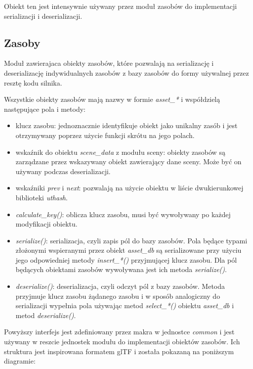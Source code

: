 Obiekt ten jest intensywnie używany przez moduł zasobów do implementacji serializacji i deserializacji.

\subsection{Zasoby}

Moduł zawierajaca obiekty zasobów, które pozwalają na serializację i deserializację indywidualnych zasobów z bazy zasobów do formy używalnej przez resztę kodu silnika.

Wszystkie obiekty zasobów mają nazwy w formie \textit{asset\_*} i współdzielą następujące pola i metody:
\begin{itemize}
	\item klucz zasobu: jednoznacznie identyfikuje obiekt jako unikalny zasób i jest otrzymywany poprzez użycie funkcji skrótu na jego polach.
	\item wskaźnik do obiektu \textit{scene\_data} z modułu sceny: obiekty zasobów są zarządzane przez wskazywany obiekt zawierający dane sceny. Może być on używany podczas deserializacji.
	\item wskaźniki \textit{prev} i \textit{next}: pozwalają na użycie obiektu w liście dwukierunkowej biblioteki \textit{uthash}.
	\item \textit{calculate\_key()}: oblicza klucz zasobu, musi być wywoływany po każdej modyfikacji obiektu.
	\item \textit{serialize()}: serializacja, czyli zapis pól do bazy zasobów.
	Pola będące typami złożonymi wspieranymi przez obiekt \textit{asset\_db} są serializowane przy użyciu jego odpowiedniej metody \textit{insert\_*()} przyjmującej klucz zasobu.
	Dla pól będących obiektami zasobów wywoływana jest ich metoda \textit{serialize()}.
	\item \textit{deserialize()}: deserializacja, czyli odczyt pól z bazy zasobów.
	Metoda przyjmuje klucz zasobu żądanego zasobu i w sposób analogiczny do serializacji wypełnia pola używając metod \textit{select\_*()} obiektu \textit{asset\_db} i metod \textit{deserialize()}.
\end{itemize}
Powyższy interfejs jest zdefiniowany przez makra w jednostce \textit{common} i jest używany w reszcie jednostek modułu do implementacji obiektów zasobów.
Ich struktura jest inspirowana formatem glTF i została pokazaną na poniższym diagramie:
